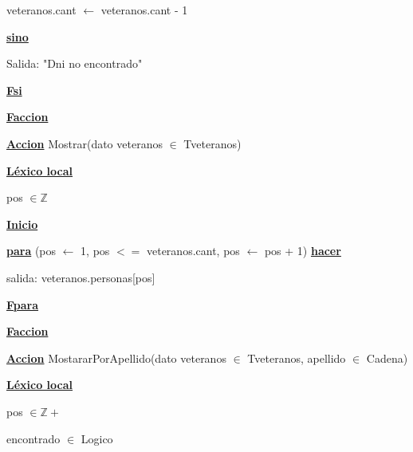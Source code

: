 \documentclass{article}
\begin{document}
                \hspace{16mm}veteranos.cant $\leftarrow$ veteranos.cant - 1

            \hspace{12mm}\underline{\textbf{sino}}

                \hspace{16mm}Salida: "Dni no encontrado"

            \hspace{12mm}\underline{\textbf{Fsi}}

    \hspace{4mm}\underline{\textbf{Faccion}}

    \vspace{4mm}

    \hspace{4mm}\underline{\textbf{Accion}} Mostrar(dato veteranos $\in$ Tveteranos)

        \hspace{8mm}\underline{\textbf{Léxico local}}

            \hspace{12mm}pos $\in \mathbb{Z}$

        \hspace{8mm}\underline{\textbf{Inicio}}

            \hspace{12mm}\underline{\textbf{para}} (pos $\leftarrow$ 1, pos $<=$ veteranos.cant, pos $\leftarrow$ pos + 1)
            \underline{\textbf{hacer}}

                \hspace{16mm}salida: veteranos.personas[pos]

            \hspace{12mm}\underline{\textbf{Fpara}}

    \hspace{4mm}\underline{\textbf{Faccion}}

    \vspace{4mm}

    \hspace{4mm}\underline{\textbf{Accion}} MostararPorApellido(dato veteranos $\in$ Tveteranos, apellido $\in$ Cadena)

        \hspace{8mm}\underline{\textbf{Léxico local}}

            \hspace{12mm}pos $\in \mathbb{Z}+$

            \hspace{12mm}encontrado $\in$ Logico
\end{document}
